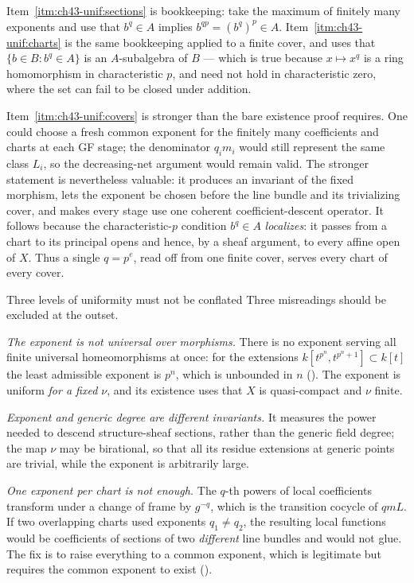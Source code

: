 Item~\cref{itm:ch43-unif:sections} is bookkeeping: take the maximum of
finitely many exponents and use that $b^{q}\in A$ implies
$b^{qp}=(b^q)^p\in A$.  Item~\cref{itm:ch43-unif:charts} is the same
bookkeeping applied to a finite cover, and uses that
$\{b\in B:b^q\in A\}$ is an $A$-subalgebra of $B$ --- which is true
because $x\mapsto x^q$ is a ring homomorphism in characteristic $p$, and
need not hold in characteristic zero, where the set can fail to be
closed under addition.

Item~\cref{itm:ch43-unif:covers} is stronger than the bare existence proof
requires.  One could choose a fresh common exponent for the finitely many
coefficients and charts at each GF stage; the denominator $q_im_i$ would
still represent the same class $L_i$, so the decreasing-net argument would
remain valid.  The stronger statement is nevertheless valuable: it produces
an invariant of the fixed morphism, lets the exponent be chosen before the
line bundle and its trivializing cover, and makes every stage use one
coherent coefficient-descent operator.  It follows because the
characteristic-$p$ condition $b^q\in A$ \emph{localizes}: it passes from
a chart to its principal opens and hence, by a sheaf argument, to every
affine open of $X$.  Thus a single $q=p^e$, read off from one finite
cover, serves every chart of every cover.

\begin{warning}{Three levels of uniformity must not be conflated}
\label{warn:ch43-uniformity}
Three misreadings should be excluded at the outset.

\emph{The exponent is not universal over morphisms.}  There is no exponent
serving all finite universal homeomorphisms at once: for the extensions
$k[t^{p^n},t^{p^n+1}]\subset k[t]$ the least admissible exponent is
$p^n$, which is unbounded in $n$
().  The exponent is uniform \emph{for a
fixed $\nu$}, and its existence uses that $X$ is quasi-compact and
$\nu$ finite.

\emph{Exponent and generic degree are different invariants.}  It measures the power needed to descend structure-sheaf sections,
rather than the generic field degree; the map $\nu$ may be
birational, so that all its residue extensions at generic points are
trivial, while the exponent is arbitrarily large.

\emph{One exponent per chart is not enough.}  The $q$-th powers of local
coefficients transform under a change of frame by $g^{-q}$, which is the
transition cocycle of $qmL$.  If two overlapping charts used exponents
$q_1\ne q_2$, the resulting local functions would be coefficients of
sections of two \emph{different} line bundles and would not glue.  The fix
is to raise everything to a common exponent, which is legitimate but
requires the common exponent to exist
().
\end{warning}

